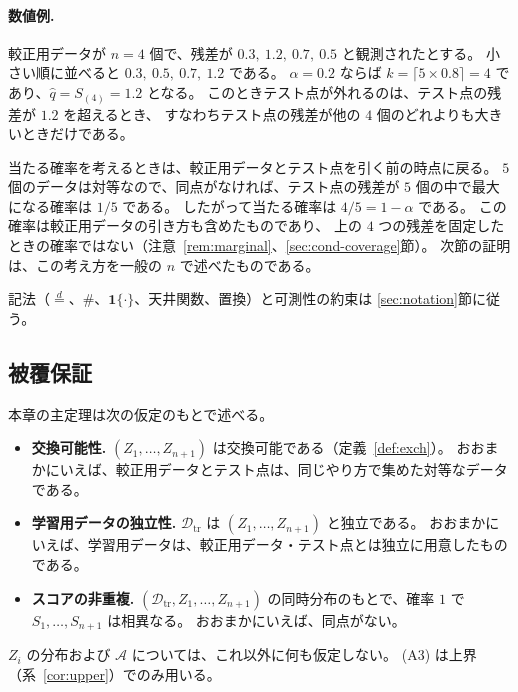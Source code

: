 \documentclass[a4paper,11pt]{jsarticle}
\theoremstyle{definition}
\theoremstyle{plain}
\theoremstyle{remark}
\newcommand{\Ind}{\mathbf{1}}                  %
\newcommand{\eqd}{\overset{d}{=}}               %
\newcommand{\Dtr}{\mathcal{D}_{\mathrm{tr}}}     %
\newcommand{\qhat}{\hat{q}}
\begin{document}
\paragraph{数値例.}
較正用データが $n=4$ 個で、残差が $0.3,\ 1.2,\ 0.7,\ 0.5$ と観測されたとする。
小さい順に並べると $0.3,\ 0.5,\ 0.7,\ 1.2$ である。
$\alpha=0.2$ ならば $k=\lceil 5\times 0.8\rceil=4$ であり、$\qhat=S_{(4)}=1.2$ となる。
このときテスト点が外れるのは、テスト点の残差が $1.2$ を超えるとき、
すなわちテスト点の残差が他の $4$ 個のどれよりも大きいときだけである。

当たる確率を考えるときは、較正用データとテスト点を引く前の時点に戻る。
$5$ 個のデータは対等なので、同点がなければ、テスト点の残差が $5$ 個の中で最大になる確率は $1/5$ である。
したがって当たる確率は $4/5=1-\alpha$ である。
この確率は較正用データの引き方も含めたものであり、
上の $4$ つの残差を固定したときの確率ではない（注意~\ref{rem:marginal}、\ref{sec:cond-coverage}節）。
次節の証明は、この考え方を一般の $n$ で述べたものである。

記法（$\eqd$、$\#$、$\Ind\{\cdot\}$、天井関数、置換）と可測性の約束は
\ref{sec:notation}節に従う。

\subsection{被覆保証}
\label{sec:coverage-guarantee}

本章の主定理は次の仮定のもとで述べる。
\begin{itemize}
  \item[\textbf{(A1)}] \textbf{交換可能性.}
    $(Z_1,\dots,Z_{n+1})$ は交換可能である（定義~\ref{def:exch}）。
    おおまかにいえば、較正用データとテスト点は、同じやり方で集めた対等なデータである。
  \item[\textbf{(A2)}] \textbf{学習用データの独立性.}
    $\Dtr$ は $(Z_1,\dots,Z_{n+1})$ と独立である。
    おおまかにいえば、学習用データは、較正用データ・テスト点とは独立に用意したものである。
  \item[\textbf{(A3)}] \textbf{スコアの非重複.}
    $(\Dtr,Z_1,\dots,Z_{n+1})$ の同時分布のもとで、確率 $1$ で
    $S_1,\dots,S_{n+1}$ は相異なる。
    おおまかにいえば、同点がない。
\end{itemize}
$Z_i$ の分布および $\mathcal{A}$ については、これ以外に何も仮定しない。
(A3) は上界（系~\ref{cor:upper}）でのみ用いる。
\end{document}
